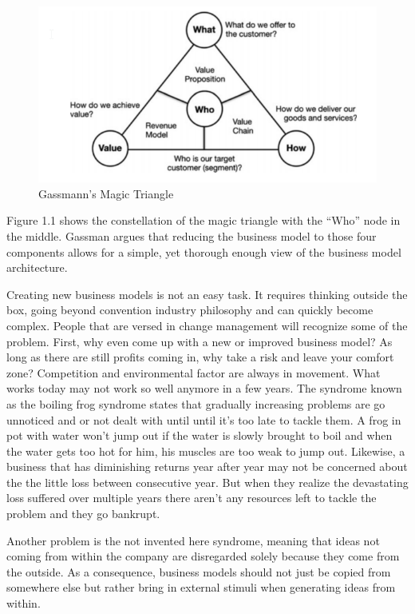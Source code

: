 	\begin{figure}[ht]
	    \begin{center}
	    \includegraphics[scale=0.6]{Talk11/Figure1.png}
	    \end{center}
	    \caption{Gassmann's Magic Triangle}
	    \label{Magic Triangle}
	\end{figure}
	Figure 1.1 shows the constellation of the magic triangle with the ``Who'' node in the middle.
	Gassman argues that reducing the business model to those four components allows for a simple, yet thorough enough view of the business model architecture.

	Creating new business models is not an easy task. It requires thinking outside the box, going beyond convention industry philosophy and can quickly become complex. People that are versed in change management will recognize some of the problem. First, why even come up with a new or improved business model? As long as there are still profits coming in, why take a risk and leave your comfort zone? Competition and environmental factor are always in movement. What works today may not work so well anymore in a few years. The syndrome known as the boiling frog syndrome states that gradually increasing problems are go unnoticed and or not dealt with until until it's too late to tackle them. A frog in pot with water won't jump out if the water is slowly brought to boil and when the water gets too hot for him, his muscles are too weak to jump out. Likewise, a business that has diminishing returns year after year may not be concerned about the the little loss between consecutive year. But when they realize the devastating loss suffered over multiple years there aren't any resources left to tackle the problem and they go bankrupt.

	Another problem is the not invented here syndrome, meaning that ideas not coming from within the company are disregarded solely because they come from the outside. As a consequence, business models should not just be copied from somewhere else but rather bring in external stimuli when generating ideas from within.

